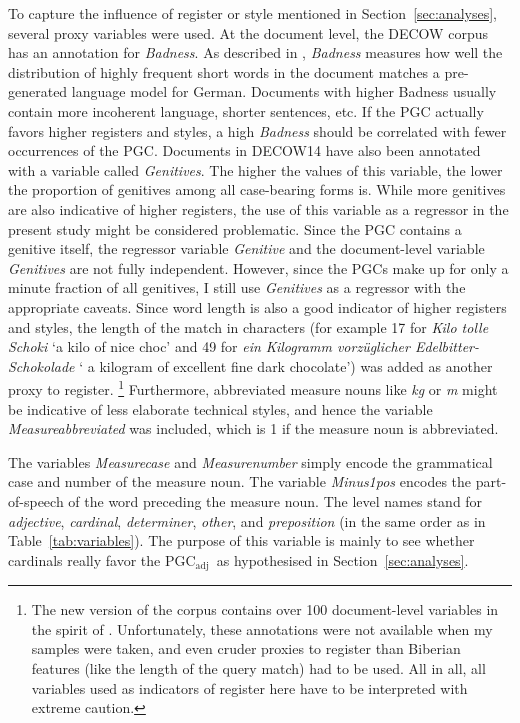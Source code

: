 \documentclass[USenglish]{article}
\newcommand{\Sub}[1]{\ensuremath{\mathrm{_{#1}}}}
\newcommand{\PGCa}{PGC\Sub{adj}}
\begin{document}
To capture the influence of register or style mentioned in Section~\ref{sec:analyses}, several proxy variables were used.
At the document level, the DECOW corpus has an annotation for \textit{Badness}.
As described in \cite{SchaeferEa2013}, \textit{Badness} measures how well the distribution of highly frequent short words in the document matches a pre-generated language model for German.
Documents with higher Badness usually contain more incoherent language, shorter sentences, etc.
If the PGC actually favors higher registers and styles, a high \textit{Badness} should be correlated with fewer occurrences of the PGC.
Documents in DECOW14 have also been annotated with a variable called \textit{Genitives}.
The higher the values of this variable, the lower the proportion of genitives among all case-bearing forms is.
While more genitives are also indicative of higher registers, the use of this variable as a regressor in the present study might be considered problematic.
Since the PGC contains a genitive itself, the regressor variable \textit{Genitive} and the document-level variable \textit{Genitives} are not fully independent.
However, since the PGCs make up for only a minute fraction of all genitives, I still use \textit{Genitives} as a regressor with the appropriate caveats.
Since word length is also a good indicator of higher registers and styles, the length of the match in characters (for example 17 for \textit{Kilo tolle Schoki} `a kilo of nice choc' and 49 for \textit{ein Kilogramm vorzüglicher Edelbitter-Schokolade} ` a kilogram of excellent fine dark chocolate') was added as another proxy to register.%
\footnote{The new version of the corpus contains over 100 document-level variables in the spirit of \cite{Biber1988}.
Unfortunately, these annotations were not available when my samples were taken, and even cruder proxies to register than Biberian features (like the length of the query match) had to be used.
All in all, all variables used as indicators of register here have to be interpreted with extreme caution.
}
Furthermore, abbreviated measure nouns like \textit{kg} or \textit{m} might be indicative of less elaborate technical styles, and hence the variable \textit{Measureabbreviated} was included, which is 1 if the measure noun is abbreviated.

The variables \textit{Measurecase} and \textit{Measurenumber} simply encode the grammatical case and number of the measure noun.
The variable \textit{Minus1pos} encodes the part-of-speech of the word preceding the measure noun.
The level names stand for \textit{adjective}, \textit{cardinal}, \textit{determiner}, \textit{other}, and \textit{preposition} (in the same order as in Table~\ref{tab:variables}).
The purpose of this variable is mainly to see whether cardinals really favor the \PGCa\ as hypothesised in Section~\ref{sec:analyses}.
\end{document}

